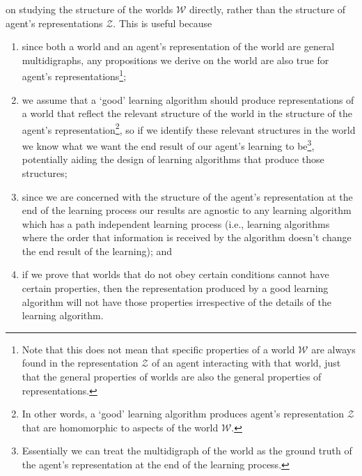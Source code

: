  on studying the structure of the worlds $\mathscr{W}$ directly, rather than the structure of agent's representations $\mathscr{Z}$.
This is useful because
\begin{enumerate}
    \item since both a world and an agent's representation of the world are general multidigraphs, any propositions we derive on the world are also true for agent's representations\footnote{
    Note that this does not mean that specific properties of a world $\mathscr{W}$ are always found in the representation $\mathscr{Z}$ of an agent interacting with that world, just that the general properties of worlds are also the general properties of representations.
    };
    
    \item we assume that a `good' learning algorithm should produce representations of a world that reflect the relevant structure of the world in the structure of the agent's representation\footnote{
    In other words, a `good' learning algorithm produces agent's representation $\mathscr{Z}$ that are homomorphic to aspects of the world $\mathscr{W}$.
    }, so if we identify these relevant structures in the world we know what we want the end result of our agent's learning to be\footnote{
    Essentially we can treat the multidigraph of the world as the ground truth of the agent's representation at the end of the learning process.
    }, potentially aiding the design of learning algorithms that produce those structures;

    \item since we are concerned with the structure of the agent's representation at the end of the learning process our results are agnostic to any learning algorithm which has a path independent learning process (i.e., learning algorithms where the order that information is received by the algorithm doesn't change the end result of the learning); and

    \item if we prove that worlds that do not obey certain conditions cannot have certain properties, then the representation produced by a good learning algorithm will not have those properties irrespective of the details of the learning algorithm.
\end{enumerate}


